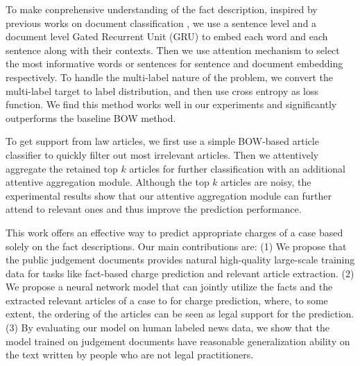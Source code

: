 To make conprehensive understanding of the fact description, inspired by previous works on document classification \cite{tang2015document,yang2016hierarchical}, we use a sentence level and a document level Gated Recurrent Unit (GRU) to embed each word and each sentence along with their contexts. 
Then we use attention mechanism to select the most informative words or sentences for sentence and document embedding respectively. 
To handle the multi-label nature of the problem, we convert the multi-label target to label distribution, and then use cross entropy as loss function. We find this method works well in our experiments and significantly outperforms the baseline BOW method.

To get support from law articles, we first use a simple BOW-based article classifier to quickly filter out most irrelevant articles. Then we attentively aggregate the retained top $k$ articles for further classification with an additional attentive aggregation module.
Although the top $k$ articles are noisy, the experimental results show that our attentive aggregation module can further attend to relevant ones and thus improve the prediction performance. 

This work offers an effective way to predict appropriate charges of a case based solely on the fact descriptions. Our main contributions are: (1) We propose that the public judgement documents provides natural high-quality large-scale training data for tasks like fact-based charge prediction and relevant article extraction. (2) We propose a neural network model that can jointly utilize the facts and the extracted relevant articles of a case to for charge prediction, where, to some extent, the ordering of the articles can be seen as legal support for the prediction. (3) By evaluating our model on human labeled news data, we show that the model trained on judgement documents have reasonable generalization ability on the text written by people who are not legal practitioners. 



